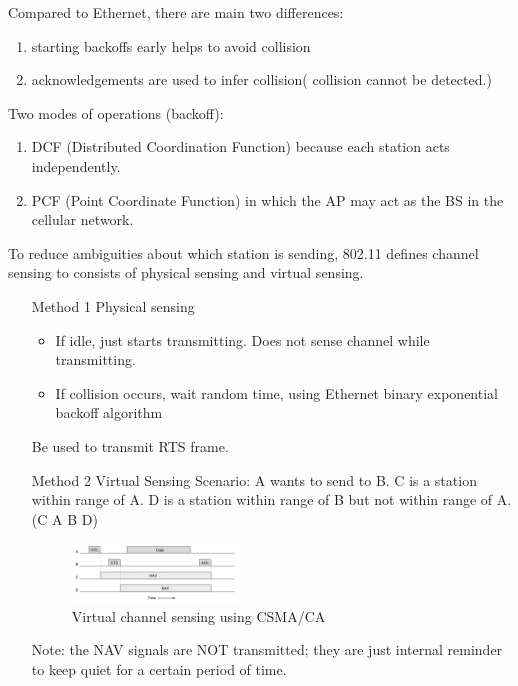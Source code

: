 Compared to Ethernet, there are main two differences:
\begin{enumerate}
    \item starting backoffs early helps to avoid collision
    \item acknowledgements are used to infer collision( collision cannot be detected.)
\end{enumerate}

Two modes of operations (backoff):
\begin{enumerate}
    \item DCF (Distributed Coordination Function) because each station acts independently.
    \item PCF (Point Coordinate Function) in which the AP may act as the BS in the cellular network.
\end{enumerate}

To reduce ambiguities about which station is sending, 802.11 defines channel sensing to consists of physical sensing and virtual sensing.
\begin{enumerate}
    \item [Method 1] Physical sensing
    \begin{itemize}
        \item  If idle, just starts transmitting. Does not sense channel while transmitting.
        \item If collision occurs, wait random time, using Ethernet binary exponential backoff algorithm    
    \end{itemize}
    Be used to transmit RTS frame.
    \item [Method 2] Virtual Sensing
    \subitem Scenario: A wants to send to B. C is a station within range of A. D is a station within range of B but not within range of A. (C A B D)
    \begin{figure}[!htb]
        \centering
        \includegraphics[width=0.42\textwidth]{pic/CN4/Virtual channel sensing using CSMACA}
        \caption{Virtual channel sensing using CSMA/CA}
    \end{figure}

    Note: the NAV signals are NOT transmitted; they are just internal reminder to keep quiet for a certain period of time.
\end{enumerate}

